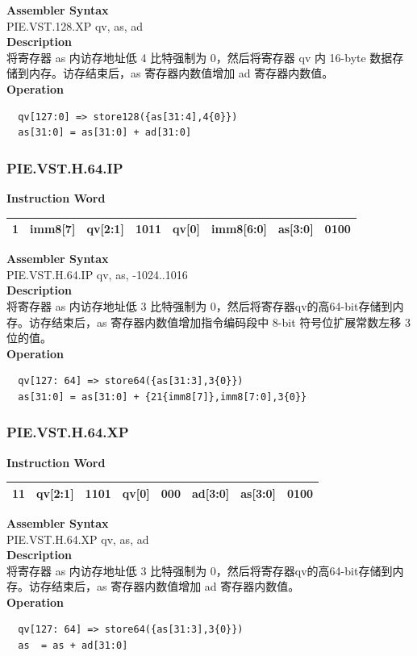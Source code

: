 \textbf{Assembler Syntax} \\
PIE.VST.128.XP qv, as, ad \\
\textbf{Description} \\
将寄存器 as 内访存地址低 4 比特强制为 0，然后将寄存器 qv 内 16-byte 数据存储到内存。访存结束后，as 寄存器内数值增加 ad 寄存器内数值。\\
\textbf{Operation}
\begin{lstlisting}
  qv[127:0] => store128({as[31:4],4{0}})
  as[31:0] = as[31:0] + ad[31:0]
\end{lstlisting}

\newpage
\subsubsection{PIE.VST.H.64.IP}\label{instruction:PIEVSTH64IP}
\setlength\tabcolsep{6pt}
\textbf{Instruction Word} \\
\begin{tabular}{|c|c|c|c|c|c|c|c|}
	\hline
	1 & imm8[7] & qv[2:1] & 1011 & qv[0] & imm8[6:0] & as[3:0] & 0100 \\
	\hline
\end{tabular}

\textbf{Assembler Syntax} \\
PIE.VST.H.64.IP qv, as, -1024..1016 \\
\textbf{Description} \\
将寄存器 as 内访存地址低 3 比特强制为 0，然后将寄存器qv的高64-bit存储到内存。访存结束后，as 寄存器内数值增加指令编码段中 8-bit 符号位扩展常数左移 3 位的值。\\
\textbf{Operation}
\begin{lstlisting}
  qv[127: 64] => store64({as[31:3],3{0}})
  as[31:0] = as[31:0] + {21{imm8[7]},imm8[7:0],3{0}}
\end{lstlisting}

\newpage
\subsubsection{PIE.VST.H.64.XP}\label{instruction:PIEVSTH64XP}
\setlength\tabcolsep{6pt}
\textbf{Instruction Word} \\
\begin{tabular}{|c|c|c|c|c|c|c|c|}
	\hline
	11 & qv[2:1] & 1101 & qv[0] & 000 & ad[3:0] & as[3:0] & 0100 \\
	\hline
\end{tabular}

\textbf{Assembler Syntax} \\
PIE.VST.H.64.XP qv, as, ad \\
\textbf{Description} \\
将寄存器 as 内访存地址低 3 比特强制为 0，然后将寄存器qv的高64-bit存储到内存。访存结束后，as 寄存器内数值增加 ad 寄存器内数值。\\
\textbf{Operation}
\begin{lstlisting}
  qv[127: 64] => store64({as[31:3],3{0}})
  as  = as + ad[31:0]
\end{lstlisting}


